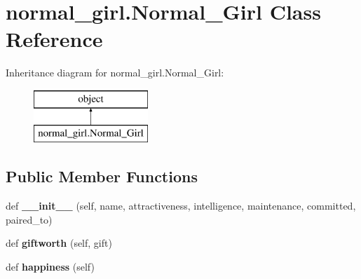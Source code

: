 \hypertarget{classnormal__girl_1_1_normal___girl}{}\section{normal\+\_\+girl.\+Normal\+\_\+\+Girl Class Reference}
\label{classnormal__girl_1_1_normal___girl}
Inheritance diagram for normal\+\_\+girl.\+Normal\+\_\+\+Girl\+:\begin{figure}[H]
\begin{center}
\leavevmode
\includegraphics[height=2.000000cm]{classnormal__girl_1_1_normal___girl}
\end{center}
\end{figure}
\subsection*{Public Member Functions}
\begin{DoxyCompactItemize}
\item 
\mbox{\label{classnormal__girl_1_1_normal___girl_a8fc16ab0acaf0997b8a4c5e0c2b57a0c}} 
def {\bfseries \+\_\+\+\_\+init\+\_\+\+\_\+} (self, name, attractiveness, intelligence, maintenance, committed, paired\+\_\+to)
\item 
\mbox{\label{classnormal__girl_1_1_normal___girl_ae7d0d26c0cfbf8152fba9113ff9ef763}} 
def {\bfseries giftworth} (self, gift)
\item 
\mbox{\label{classnormal__girl_1_1_normal___girl_a6508d58dab5d0c59d769f3f0c1325b46}} 
def {\bfseries happiness} (self)
\end{DoxyCompactItemize}
